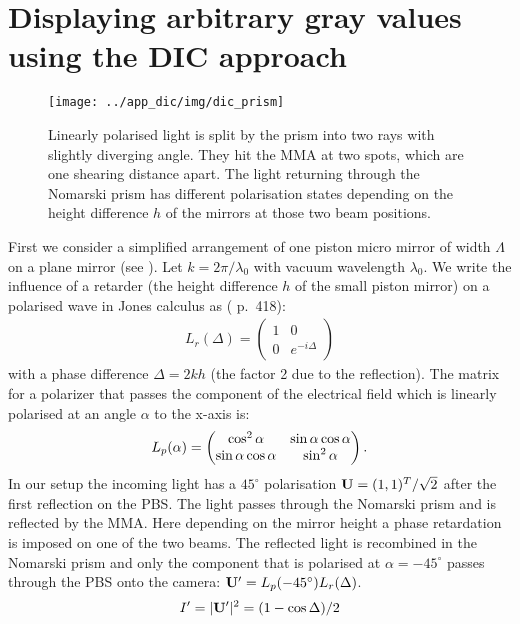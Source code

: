 \section{Displaying arbitrary gray values using the DIC approach}
\begin{figure}[htb]
  \centering
  \texttt{[image: ../app\_dic/img/dic\_prism]}
  \caption{ Linearly polarised light is split by the prism into two
    rays with slightly diverging angle. They hit the MMA at two spots,
    which are one shearing distance apart. The light returning through
    the Nomarski prism has different polarisation states depending on
    the height difference $h$ of the mirrors at those two beam
    positions.}
  \label{fig:prism}
\end{figure}
First we consider a simplified arrangement of one piston micro mirror
of width $\Lambda$ on a plane mirror (see ).  Let
$k=2\pi/\lambda_0$ with vacuum wavelength $\lambda_0$. We write the
influence of a retarder (the height difference $h$ of the small piston
mirror) on a polarised wave in Jones calculus as (\cite{1996Goodman}
p.~418):
\begin{align}
L_r(\Delta)=\begin{pmatrix}1&0\\ 0&e^{-i\Delta}\end{pmatrix}
\end{align}
with a phase difference $\Delta=2kh$ (the factor 2 due to the
reflection).  The matrix for a polarizer that passes the component of
the electrical field which is linearly polarised at an angle $\alpha$
to the x-axis is:
\begin{align}
L_p(\alpha)=\begin{pmatrix}\cos^2\alpha&\sin\alpha\cos\alpha\cr
  \sin\alpha\cos\alpha&\sin^2\alpha\end{pmatrix}.
\end{align}
In our setup the incoming light has a $45^\circ$ polarisation $\mathbf{U}=(1,1)^T/\sqrt{2}$ after the first reflection on the PBS. The light
passes through the Nomarski prism and is reflected by the MMA. Here
depending on the mirror height a phase retardation is imposed on one
of the two beams. The reflected light is recombined in the Nomarski
prism and only the component that is polarised at $\alpha=-45^\circ$
passes through the PBS onto the camera: $\mathbf{U}'=L_p(-45^\circ)L_r(\Delta)$.
\begin{align}
  I'=|\mathbf{U}'|^2=(1-\cos\Delta)/2
\end{align}
